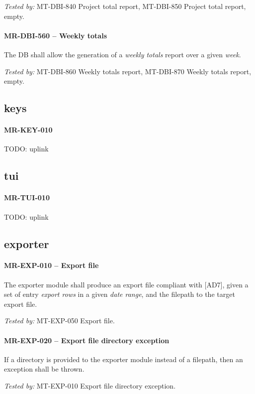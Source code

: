 \textit{Tested by: } MT-DBI-840 Project total report,
MT-DBI-850 Project total report, empty.

\paragraph{MR-DBI-560 -- Weekly totals}
The \gls{DB} shall allow the generation of a \emph{weekly totals} report
over a given \emph{week}.

\textit{Tested by: } MT-DBI-860 Weekly totals report,
MT-DBI-870 Weekly totals report, empty.

\subsection{keys}
\paragraph{MR-KEY-010}
TODO: uplink

\subsection{tui}
\paragraph{MR-TUI-010}
TODO: uplink

\subsection{exporter}
\paragraph{MR-EXP-010 -- Export file}
The exporter module shall produce an export file compliant with [AD7],
given a set of entry \emph{export rows} in a given \emph{date range},
and the filepath to the target export file.

\textit{Tested by: } MT-EXP-050 Export file.

\paragraph{MR-EXP-020 -- Export file directory exception}
If a directory is provided to the exporter module instead of a filepath,
then an exception shall be thrown.

\textit{Tested by: } MT-EXP-010 Export file directory exception.

